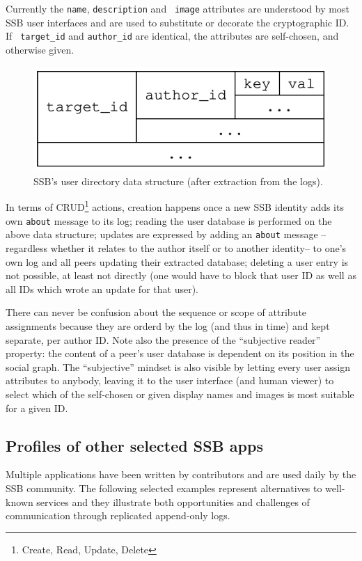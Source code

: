 \documentclass[9pt,sigconf]{acmart}
\begin{document}
Currently the {\small\tt name}, {\small\tt description} and {\small\tt
  image} attributes are understood by most SSB user interfaces and are
used to substitute or decorate the cryptographic ID. If {\small\tt
  target\_id} and {\small\tt author\_id} are identical, the
attributes are self-chosen, and otherwise given.

\begin{figure}[htb]
  \includegraphics[width=0.6\columnwidth]{figs/about-ds.pdf}
  \caption{SSB's user directory data structure (after extraction from the logs).}
  \label{fig:about}
\end{figure}

\noindent
In terms of CRUD\footnote{Create, Read, Update, Delete} actions, creation happens once a new SSB identity adds
its own {\small\tt about} message to its log; reading the user database
is performed on the above data structure; updates are expressed by
adding an {\small\tt about} message --regardless whether it relates to
the author itself or to another identity-- to one's own log and all peers
updating their extracted database; deleting a user entry is not
possible, at least not directly (one would have to block that user ID
as well as all IDs which wrote an update for that user).

There can never be confusion about the sequence or scope of attribute
assignments because they are orderd by the log (and thus in time) and
kept separate, per author ID. Note also the presence of the
``subjective reader'' property: the content of a peer's user database
is dependent on its position in the social graph. The ``subjective''
mindset is also visible by letting every user assign attributes to
anybody, leaving it to the user interface (and human viewer) to select
which of the self-chosen or given display names and images is most suitable
for a given ID.

\subsection{Profiles of other selected SSB apps}
\label{Section:AppProfiles}

Multiple applications have been written by contributors and are used daily by
the SSB community. The following selected examples represent
alternatives to well-known services and they illustrate both opportunities and
challenges of communication through replicated append-only logs.
\end{document}
